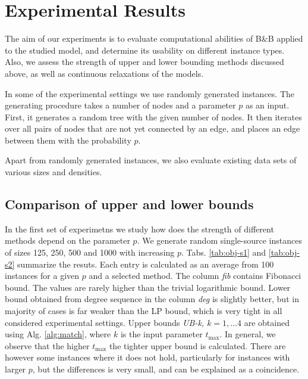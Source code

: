 \section{Experimental Results} \label{sec:exp}

The aim of our experiments is to evaluate computational abilities of B\&B applied to the studied model, and determine its usability on different instance types.
Also, we assess the strength of upper and lower bounding methods discussed above, as well as continuous relaxations of the models.

In some of the experimental settings we use randomly generated instances.
The generating procedure takes a number of nodes and a parameter $p$ as an input.
First, it generates a random tree with the given number of nodes.
It then iterates over all pairs of nodes that are not yet connected by an edge, and places an edge between them with the probability $p$.

Apart from randomly generated instances, we also evaluate existing data sets of various sizes and densities.

\subsection{Comparison of upper and lower bounds}

In the first set of experimetns we study how does the strength of different methods depend on the parameter $p$.
We generate random single-source instances of sizes 125, 250, 500 and 1000 with increasing $p$.
Tabs. \ref{tab:obj-s1} and \ref{tab:obj-s2} summarize the resuts.
Each entry is calculated as an average from 100 instances for a given $p$ and a selected method.
The column \emph{fib} contains Fibonacci bound.
The values are rarely higher than the trivial logarithmic bound.
Lower bound obtained from degree sequence in the column \emph{deg} is slightly better, 
but in majority of cases is far weaker than the LP bound, which is very tight in all considered experimental settings.
Upper bounds \emph{UB-k, $k=1,\dots 4$} are obtained using Alg. \ref{alg:match}, where $k$ is the input parameter $t_{\text{max}}$.
In general, we observe that the higher $t_{\text{max}}$ the tighter upper bound is calculated.
There are however some instances where it does not hold, particularly for instances with larger $p$,  but the differences is very small, and can be explained as a coincidence.

